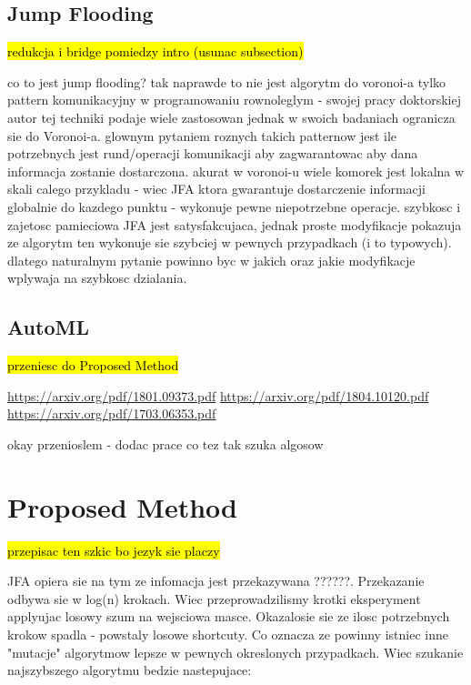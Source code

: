 \documentclass[format=acmsmall,screen,review,authordraft,nonacm]{acmart}
\begin{document}
\subsection{Jump Flooding} %

\hl{redukcja i bridge pomiedzy intro (usunac subsection)}

co to jest jump flooding? tak naprawde to nie jest algorytm do voronoi-a tylko
pattern komunikacyjny w programowaniu rownoleglym - swojej pracy doktorskiej
autor tej techniki podaje wiele zastosowan jednak w swoich badaniach ogranicza
sie do Voronoi-a. glownym pytaniem roznych takich patternow jest ile potrzebnych
jest rund/operacji komunikacji aby zagwarantowac aby dana informacja zostanie
dostarczona. akurat w voronoi-u wiele komorek jest lokalna w skali calego
przykladu - wiec JFA ktora gwarantuje dostarczenie informacji globalnie do
kazdego punktu - wykonuje pewne niepotrzebne operacje.  szybkosc i zajetosc
pamieciowa JFA jest satysfakcujaca, jednak proste modyfikacje pokazuja ze
algorytm ten wykonuje sie szybciej w pewnych przypadkach (i to typowych).
dlatego naturalnym pytanie powinno byc w jakich oraz jakie modyfikacje wplywaja
na szybkosc dzialania.

\subsection{AutoML} %

\hl{przeniesc do Proposed Method}

\url{https://arxiv.org/pdf/1801.09373.pdf}
\url{https://arxiv.org/pdf/1804.10120.pdf}
\url{https://arxiv.org/pdf/1703.06353.pdf}

okay przenioslem - dodac prace co tez tak szuka algosow

\section{Proposed Method} %

\hl{przepisac ten szkic bo jezyk sie placzy}

JFA opiera sie na tym ze infomacja jest przekazywana ??????.  Przekazanie odbywa
sie w log(n) krokach. Wiec przeprowadzilismy krotki eksperyment applyujac losowy
szum na wejsciowa masce. Okazalosie sie ze ilosc potrzebnych krokow spadla -
powstaly losowe shortcuty.  Co oznacza ze powinny istniec inne "mutacje"
algorytmow lepsze w pewnych okreslonych przypadkach.  Wiec szukanie najszybszego
algorytmu bedzie nastepujace:
\end{document}
